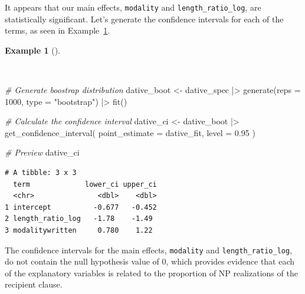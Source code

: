 \documentclass[
  letterpaper,
]{book}
\newenvironment{Shaded}{\begin{snugshade}}{\end{snugshade}}
\newcommand{\AttributeTok}[1]{\textcolor[rgb]{0.00,0.00,0.00}{#1}}
\newcommand{\CommentTok}[1]{\textcolor[rgb]{0.00,0.00,0.00}{\textit{#1}}}
\newcommand{\DecValTok}[1]{\textcolor[rgb]{0.00,0.00,0.00}{#1}}
\newcommand{\FloatTok}[1]{\textcolor[rgb]{0.00,0.00,0.00}{#1}}
\newcommand{\FunctionTok}[1]{\textcolor[rgb]{0.00,0.00,0.00}{#1}}
\newcommand{\NormalTok}[1]{\textcolor[rgb]{0.00,0.00,0.00}{#1}}
\newcommand{\OtherTok}[1]{\textcolor[rgb]{0.00,0.00,0.00}{#1}}
\newcommand{\SpecialCharTok}[1]{\textcolor[rgb]{0.00,0.00,0.00}{#1}}
\newcommand{\StringTok}[1]{\textcolor[rgb]{0.00,0.00,0.00}{#1}}
\theoremstyle{definition}
\newtheorem{example}{Example}[chapter]
\theoremstyle{remark}
\begin{document}
It appears that our main effects, \texttt{modality} and
\texttt{length\_ratio\_log}, are statistically significant. Let's
generate the confidence intervals for each of the terms, as seen in
Example~\ref{exm-infer-cat-confidence-interval-logistic-regression}.

\begin{example}[]\protect\hypertarget{exm-infer-cat-confidence-interval-logistic-regression}{}\label{exm-infer-cat-confidence-interval-logistic-regression}

~

\begin{Shaded}
\begin{Highlighting}[]
\CommentTok{\# Generate boostrap distribution}
\NormalTok{dative\_boot }\OtherTok{\textless{}{-}}
\NormalTok{  dative\_spec }\SpecialCharTok{|\textgreater{}}
  \FunctionTok{generate}\NormalTok{(}\AttributeTok{reps =} \DecValTok{1000}\NormalTok{, }\AttributeTok{type =} \StringTok{"bootstrap"}\NormalTok{) }\SpecialCharTok{|\textgreater{}}
  \FunctionTok{fit}\NormalTok{()}

\CommentTok{\# Calculate the confidence interval}
\NormalTok{dative\_ci }\OtherTok{\textless{}{-}}
\NormalTok{  dative\_boot }\SpecialCharTok{|\textgreater{}}
  \FunctionTok{get\_confidence\_interval}\NormalTok{(}
    \AttributeTok{point\_estimate =}\NormalTok{ dative\_fit,}
    \AttributeTok{level =} \FloatTok{0.95}
\NormalTok{  )}

\CommentTok{\# Preview}
\NormalTok{dative\_ci}
\end{Highlighting}
\end{Shaded}

\begin{verbatim}
# A tibble: 3 x 3
  term             lower_ci upper_ci
  <chr>               <dbl>    <dbl>
1 intercept          -0.677   -0.452
2 length_ratio_log   -1.78    -1.49 
3 modalitywritten     0.780    1.22 
\end{verbatim}

\end{example}

The confidence intervals for the main effects, \texttt{modality} and
\texttt{length\_ratio\_log}, do not contain the null hypothesis value of
0, which provides evidence that each of the explanatory variables is
related to the proportion of NP realizations of the recipient clause.
\end{document}
